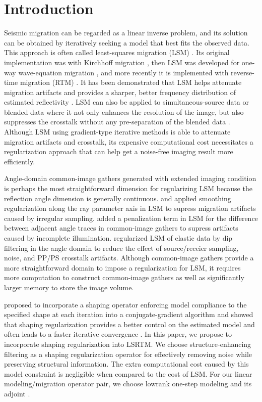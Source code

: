 \section{Introduction}
Seismic migration can be regarded as a linear inverse problem, 
and its solution can be obtained by iteratively seeking a model that best fits the observed data. 
This approach is often called least-squares migration (LSM) \cite[]{lsdmo}. 
Its original implementation was with Kirchhoff migration \cite[]{nemeth,duquet}, 
then LSM was developed for one-way wave-equation migration \cite[]{kuehl,juefu2004,clapp05}, 
and more recently it is implemented with reverse-time migration (RTM) \cite[]{multi12,yuzhang,yujin,zeyu15,jie15,junzhe15}.
It has been demonstrated that LSM helps attenuate migration artifacts and provides a sharper, 
better frequency distribution of estimated reflectivity \cite[]{nemeth,kuehl,yaxun07,dutta2014}.
LSM can also be applied to simultaneous-source data \cite[]{beasley,hampson2008} or blended data \cite[]{berkhout} 
where it not only enhances the resolution of the image, 
but also suppresses the crosstalk without any pre-separation of the blended data \cite[]{yaxun09,daiwei09}.
Although LSM using gradient-type iterative methods is able to attenuate migration artifacts and crosstalk, 
its expensive computational cost necessitates a regularization approach that can help get a noise-free imaging result more efficiently.

Angle-domain common-image gathers generated with extended imaging condition \cite[]{sava03,biondi04,sava06}
is perhaps the most straightforward dimension for regularizing LSM 
because the reflection angle dimension is generally continuous.
\cite{prucha02} and \cite{kuehl} applied smoothing regularization along the ray parameter axis in LSM to supress migration artifacts caused by irregular sampling.
\cite{salomons14} added 
a penalization term in LSM for the difference between adjacent angle traces in common-image gathers 
to supress artifacts caused by incomplete illumination.
\cite{stanton15} regularized LSM of elastic data by dip filtering in the angle domain to reduce the effect of source/receier sampling,
noise, and PP/PS crosstalk artifacts.
Although common-image gathers provide a more straightforward domain to impose a regularization for LSM, 
it requires more computation to
construct common-image gathers as well as significantly larger memory to store the image volume.

\cite{sergeyshape1} proposed to incorporate a shaping operator enforcing model compliance to the 
specified shape at each iteration into a conjugate-gradient algorithm 
and showed that shaping regularization provides a better control on the estimated model and often leads to a faster iterative convergence \cite[]{fomel09}.
In this paper, we propose to incorporate shaping regularization into LSRTM. 
We choose structure-enhancing filtering \cite[]{liuyang,swindeman15} as a shaping regularization operator 
for effectively removing noise while preserving structural information. 
The extra computational cost caused by this model constraint is negligible when compared to the cost of LSM.
For our linear modeling/migration operator pair, we choose lowrank one-step modeling and its adjoint \cite[]{junzhe14}.

